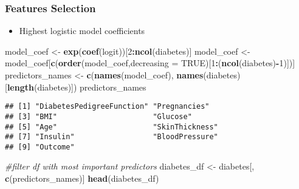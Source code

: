 \documentclass[
]{article}
\newenvironment{Shaded}{\begin{snugshade}}{\end{snugshade}}
\newcommand{\AttributeTok}[1]{\textcolor[rgb]{0.13,0.29,0.53}{#1}}
\newcommand{\CommentTok}[1]{\textcolor[rgb]{0.56,0.35,0.01}{\textit{#1}}}
\newcommand{\ConstantTok}[1]{\textcolor[rgb]{0.56,0.35,0.01}{#1}}
\newcommand{\DecValTok}[1]{\textcolor[rgb]{0.00,0.00,0.81}{#1}}
\newcommand{\FunctionTok}[1]{\textcolor[rgb]{0.13,0.29,0.53}{\textbf{#1}}}
\newcommand{\NormalTok}[1]{#1}
\newcommand{\OtherTok}[1]{\textcolor[rgb]{0.56,0.35,0.01}{#1}}
\newcommand{\SpecialCharTok}[1]{\textcolor[rgb]{0.81,0.36,0.00}{\textbf{#1}}}
\providecommand{\tightlist}{%
  \setlength{\itemsep}{0pt}\setlength{\parskip}{0pt}}
\begin{document}
\hypertarget{features-selection}{%
\subsubsection{Features Selection}\label{features-selection}}

\begin{itemize}
\tightlist
\item
  Highest logistic model coefficients
\end{itemize}

\begin{Shaded}
\begin{Highlighting}[]
\NormalTok{model\_coef }\OtherTok{\textless{}{-}} \FunctionTok{exp}\NormalTok{(}\FunctionTok{coef}\NormalTok{(logit))[}\DecValTok{2}\SpecialCharTok{:}\FunctionTok{ncol}\NormalTok{(diabetes)]}
\NormalTok{model\_coef }\OtherTok{\textless{}{-}}\NormalTok{ model\_coef[}\FunctionTok{c}\NormalTok{(}\FunctionTok{order}\NormalTok{(model\_coef,}\AttributeTok{decreasing =} \ConstantTok{TRUE}\NormalTok{)[}\DecValTok{1}\SpecialCharTok{:}\NormalTok{(}\FunctionTok{ncol}\NormalTok{(diabetes)}\SpecialCharTok{{-}}\DecValTok{1}\NormalTok{)])]}
\NormalTok{predictors\_names }\OtherTok{\textless{}{-}} \FunctionTok{c}\NormalTok{(}\FunctionTok{names}\NormalTok{(model\_coef), }\FunctionTok{names}\NormalTok{(diabetes)[}\FunctionTok{length}\NormalTok{(diabetes)])}
\NormalTok{predictors\_names}
\end{Highlighting}
\end{Shaded}

\begin{verbatim}
## [1] "DiabetesPedigreeFunction" "Pregnancies"             
## [3] "BMI"                      "Glucose"                 
## [5] "Age"                      "SkinThickness"           
## [7] "Insulin"                  "BloodPressure"           
## [9] "Outcome"
\end{verbatim}

\begin{Shaded}
\begin{Highlighting}[]
\CommentTok{\#filter df with most important predictors}
\NormalTok{diabetes\_df }\OtherTok{\textless{}{-}}\NormalTok{ diabetes[, }\FunctionTok{c}\NormalTok{(predictors\_names)]}
\FunctionTok{head}\NormalTok{(diabetes\_df)}
\end{Highlighting}
\end{Shaded}
\end{document}
